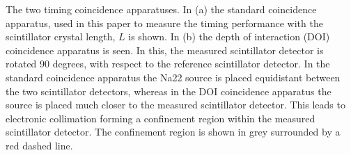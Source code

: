 \label{fig:doi-ctr} The two timing coincidence apparatuses. In (a) the standard coincidence apparatus, used in this paper to measure the timing performance with the scintillator crystal length, $L$ is shown. In (b) the depth of interaction (DOI) coincidence apparatus is seen. In this, the measured scintillator detector is rotated 90 degrees, with respect to the reference scintillator detector. In the standard coincidence apparatus the Na22 source is placed equidistant between the two scintillator detectors, whereas in the DOI coincidence apparatus the source is placed much closer to the measured scintillator detector. This leads to electronic collimation forming a confinement region within the measured scintillator detector. The confinement region is shown in grey surrounded by a red dashed line\cite{Moses_Ullisch_2006}\cite{Moses_Ullisch_2006}.
